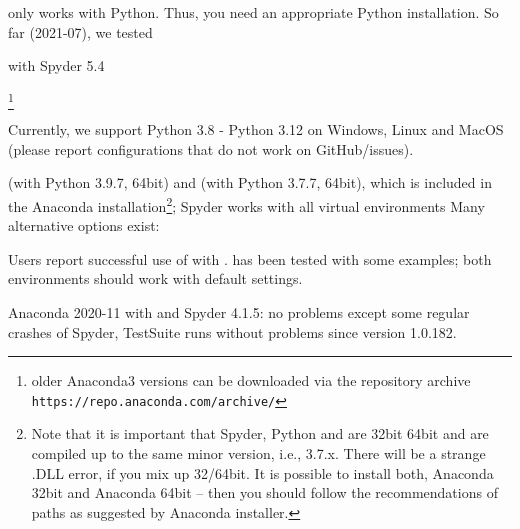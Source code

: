 \codeName only works with Python. Thus, you need an appropriate Python installation.
So far (2021-07), we tested
\bi
  \item {} with Spyder 5.4
  \item {}\footnote{older Anaconda3 versions can be downloaded via the repository archive \texttt{https://repo.anaconda.com/archive/}}
  \item Currently, we support Python 3.8 - Python 3.12  on Windows, Linux and MacOS (please report configurations that do not work on GitHub/issues).
  \item {} (with Python 3.9.7, 64bit) and  (with Python 3.7.7, 64bit), which is included in the Anaconda installation\footnote{Note that it is important that Spyder, Python and \codeName  are  32bit  64bit and are compiled up to the same minor version, i.e., 3.7.x. There will be a strange .DLL error, if you mix up 32/64bit. It is possible to install both, Anaconda 32bit and Anaconda 64bit -- then you should follow the recommendations of paths as suggested by Anaconda installer.}; Spyder works with all virtual environments
\ei
Many alternative options exist:
\bi
  \item Users report successful use of \codeName with .  has been tested with some examples; both environments should work with default settings.
  \item Anaconda 2020-11 with  and Spyder 4.1.5: no problems except some regular crashes of Spyder, TestSuite runs without problems since \codeName version 1.0.182.
